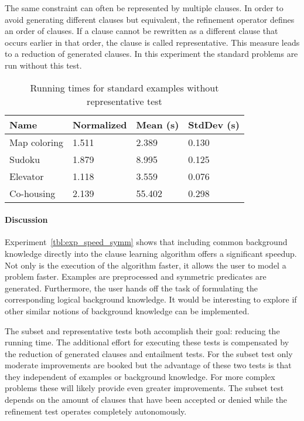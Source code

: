 \begin{experiment}
	The same constraint can often be represented by multiple clauses.
	In order to avoid generating different clauses but equivalent, the refinement operator defines an order of clauses.
	If a clause cannot be rewritten as a different clause that occurs earlier in that order, the clause is called representative.
	This measure leads to a reduction of generated clauses.
	In this experiment the standard problems are run without this test.

	\begin{table}[!htp]
		\begin{tabularx}{\textwidth}{XXXX}
			\textbf{Name}	& \textbf{Normalized}	& \textbf{Mean (s)}	& \textbf{StdDev (s)} \\
			\toprule
			Map coloring 	& 1.511					& 2.389				& 0.130 \\
			Sudoku 			& 1.879					& 8.995				& 0.125 \\
			Elevator 		& 1.118					& 3.559 			& 0.076 \\
			Co-housing 		& 2.139					& 55.402			& 0.298
		\end{tabularx}
		\label{tbl:exp_speed_no_representative}
		\caption{Running times for standard examples without representative test}
	\end{table}

\end{experiment}

\paragraph{Discussion}
Experiment~\ref{tbl:exp_speed_symm} shows that including common background knowledge directly into the clause learning algorithm offers a significant speedup.
Not only is the execution of the algorithm faster, it allows the user to model a problem faster.
Examples are preprocessed and symmetric predicates are generated.
Furthermore, the user hands off the task of formulating the corresponding logical background knowledge.
It would be interesting to explore if other similar notions of background knowledge can be implemented.

The subset and representative tests both accomplish their goal: reducing the running time.
The additional effort for executing these tests is compensated by the reduction of generated clauses and entailment tests.
For the subset test only moderate improvements are booked but the advantage of these two tests is that they independent of examples or background knowledge.
For more complex problems these will likely provide even greater improvements.
The subset test depends on the amount of clauses that have been accepted or denied while the refinement test operates completely autonomously.

